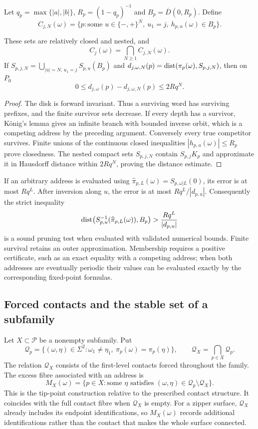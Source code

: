 Let $q_p=\max\{|a|,|b|\}$, $R_p=(1-q_p)^{-1}$ and
$B_p=\overline D(0,R_p)$. Define
\[
 C_{j,N}(\omega)=\{p:\text{some }u\in\{-,+\}^N,\ u_1=j,
                        \ h_{p,u}(\omega)\in B_p\}.
\]
\begin{proposition}
\label{prop:fibre-exhaustion}
These sets are relatively closed and nested, and
\[
 C_j(\omega)=\bigcap_{N\ge1}C_{j,N}(\omega).
\]
If $S_{p,j,N}=\bigcup_{|u|=N,\,u_1=j}S_{p,u}(B_p)$ and
$d_{j,\omega,N}(p)=\operatorname{dist}(\pi_p(\omega),S_{p,j,N})$, then on $P_0$
\[
 0\le d_{j,\omega}(p)-d_{j,\omega,N}(p)\le2Rq^N.
\]
\end{proposition}
\begin{proof}
The disk is forward invariant. Thus a surviving word has surviving prefixes,
and the finite survivor sets decrease. If every depth has a survivor,
K\"onig's lemma gives an infinite branch with bounded inverse orbit, which
is a competing address by the preceding argument. Conversely every true
competitor survives. Finite unions of the continuous closed inequalities
$|h_{p,u}(\omega)|\le R_p$ prove closedness. The nested compact sets
$S_{p,j,N}$ contain $S_{p,j}K_p$ and approximate it in Hausdorff distance
within $2Rq^N$, proving the distance estimate.
\end{proof}

If an arbitrary address is evaluated using
$\widehat\pi_{p,L}(\omega)=S_{p,\omega|L}(0)$, its error is at most $Rq^L$.
After inversion along $u$, the error is at most $Rq^L/|d_{p,u}|$.
Consequently the strict inequality
\begin{equation}\label{eq:fibre-safe-pruning}
 \operatorname{dist}\bigl(S_{p,u}^{-1}(\widehat\pi_{p,L}(\omega)),B_p\bigr)
       >\frac{Rq^L}{|d_{p,u}|}
\end{equation}
is a sound pruning test when evaluated with validated numerical bounds.
Finite survival retains an outer approximation. Membership requires a
positive certificate, such as an exact equality with a competing address;
when both addresses are eventually periodic their values can be evaluated
exactly by the corresponding fixed-point formulas.

\subsection{Forced contacts and the stable set of a subfamily}

Let $X\subset\mathcal P$ be a nonempty subfamily. Put
\[
 \mathscr Q_p=\{(\omega,\eta)\in\Sigma^2:\omega_1\ne\eta_1,
                         \ \pi_p(\omega)=\pi_p(\eta)\},\qquad
 \mathscr Q_X=\bigcap_{p\in X}\mathscr Q_p.
\]
The relation $\mathscr Q_X$ consists of the first-level contacts forced throughout
the family. The excess fibre associated with an address is
\[
 M_X(\omega)=\{p\in X:\text{some }\eta\text{ satisfies }
                        (\omega,\eta)\in \mathscr Q_p\setminus \mathscr Q_X\}.
\]
This is the tip-point construction relative to the prescribed contact
structure. It coincides with the full contact fibre when $\mathscr Q_X$ is empty.
For a zipper surface, $\mathscr Q_X$ already includes its endpoint identifications,
so $M_X(\omega)$ records additional identifications rather than the contact
that makes the whole surface connected.

